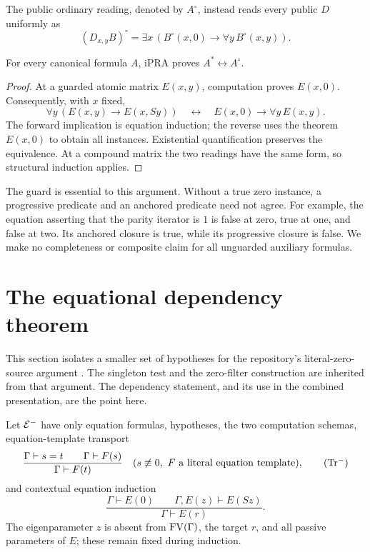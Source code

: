 The public ordinary reading, denoted by $A^\circ$, instead reads every
public $D$ uniformly as
\[
 (D_{x,y}B)^\circ=\exists x\,(B^\circ(x,0)\to\forall y\,B^\circ(x,y)).
 \tag{O}\label{eq:ordinary}
\]

\begin{lemma}
For every canonical formula $A$, iPRA proves $A^*\leftrightarrow A^\circ$.
\end{lemma}
\begin{proof}
At a guarded atomic matrix $E(x,y)$, computation proves $E(x,0)$.
Consequently, with $x$ fixed,
\[
 \forall y\,(E(x,y)\to E(x,Sy))
 \quad\longleftrightarrow\quad
 E(x,0)\to\forall y\,E(x,y).
\]
The forward implication is equation induction; the reverse uses the
theorem $E(x,0)$ to obtain all instances. Existential quantification
preserves the equivalence. At a compound matrix the two readings have the
same form, so structural induction applies.
\end{proof}

The guard is essential to this argument. Without a true zero instance, a
progressive predicate and an anchored predicate need not agree. For example,
the equation asserting that the parity iterator is $1$ is false at zero,
true at one, and false at two. Its anchored closure is true, while its
progressive closure is false. We make no completeness or composite claim
for all unguarded auxiliary formulas.

\section{The equational dependency theorem}
\label{sec:equational}

This section isolates a smaller set of hypotheses for the repository's
literal-zero-source argument \cite{source}. The singleton test and the
zero-filter construction are inherited from that argument. The dependency
statement, and its use in the combined presentation, are the point here.

\begin{definition}
Let $\mathcal E^{-}$ have only equation formulas, hypotheses, the two computation
schemas, equation-template transport
\[
 \frac{\Gamma\vdash s=t\qquad\Gamma\vdash F(s)}{\Gamma\vdash F(t)}
 \quad(s\not\equiv0,\ F\text{ a literal equation template}),
 \tag{Tr$^-$}\label{eq:trminus}
\]
and contextual equation induction
\[
 \frac{\Gamma\vdash E(0)\qquad\Gamma,E(z)\vdash E(Sz)}
      {\Gamma\vdash E(r)}.
 \tag{EI}\label{eq:ei}
\]
The eigenparameter $z$ is absent from $\operatorname{FV}(\Gamma)$, the target $r$, and
all passive parameters of $E$; these remain fixed during induction.
\end{definition}


